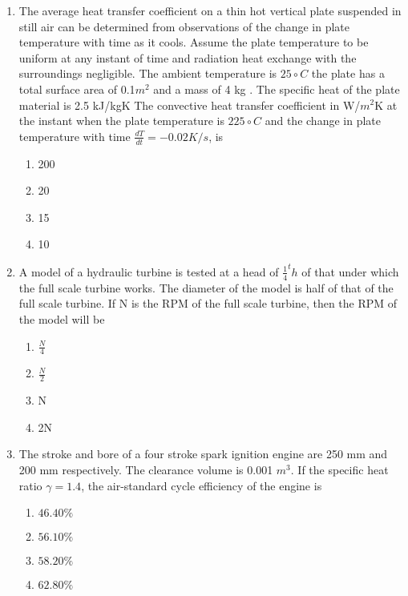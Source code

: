 \documentclass[journal]{IEEEtran}
\begin{document}
\begin{enumerate}
\begin{multicols}{4}
\begin{enumerate}
              \item 35
              \item 45
            \end{enumerate}
        \end{multicols}
        \item The average heat transfer coefficient on a thin hot vertical plate suspended in still air can be determined from observations of the change in plate temperature with time as it cools. Assume the plate temperature to be uniform at any instant of time and radiation heat exchange with the surroundings negligible. The ambient temperature is $25{\circ} C $  the plate has a total surface area of 0.1$m^2$ and a mass of 4 kg . The specific heat of the plate material is 2.5 kJ/kgK The convective heat transfer coefficient in W/$m^2$K at the instant when the plate temperature is $225{\circ}C$ and the change in plate temperature with time $\frac{dT}{dt}=-0.02K/s$, is
        \begin{multicols}{4}
            \begin{enumerate}
              \item 200
              \item  20
              \item 15
              \item 10
            \end{enumerate}
        \end{multicols}
        \item A model of a hydraulic turbine is tested at a head of $\frac{1}{4}^th$ of that under which the full scale turbine works. The diameter of the model is half of that of the full scale turbine. If N is the RPM of the full scale turbine, then the RPM of the model will be
        \begin{multicols}{4}
            \begin{enumerate}
              \item $\frac{N}{4}$
              \item  $\frac{N}{2}$
              \item N
              \item 2N
            \end{enumerate}
        \end{multicols}
        \item  The stroke and bore of a four stroke spark ignition engine are 250 mm and 200 mm respectively. The clearance volume is 0.001 $m^3$. If the specific heat ratio $\gamma=1.4$,
        the air-standard cycle efficiency of the engine is
        \begin{multicols}{4}
        \begin{enumerate}
        \item $46.40 \%$
        \item $56.10 \%$
          \item  $58.20 \%$
          \item $62.80 \%$
          \end{enumerate}
        \end{multicols}

        
 \end{enumerate}
\end{document}
